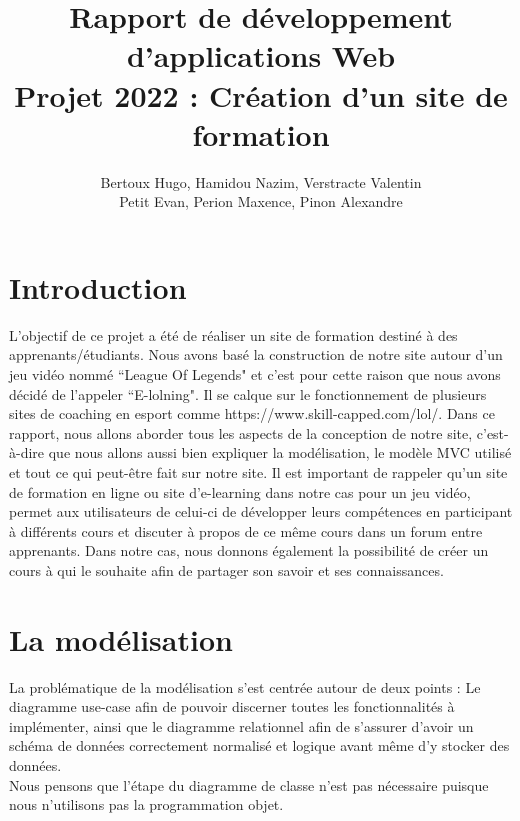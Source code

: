 \documentclass[a4paper,11pt]{article}
\title{
Rapport de développement d'applications Web\\
Projet 2022 : Création d'un site de formation
}
\author{
Bertoux Hugo, Hamidou Nazim, Verstracte Valentin\\
Petit Evan, Perion Maxence, Pinon Alexandre
}
\date{}
\begin{document}
\maketitle 
\tableofcontents

\newpage
\section{Introduction}
L'objectif de ce projet a été de réaliser un site de formation destiné à des apprenants/étudiants. Nous avons basé la construction de notre site autour d'un jeu vidéo nommé ``League Of Legends" et c'est pour cette raison que nous avons décidé de l'appeler ``E-lolning". Il se calque sur le fonctionnement de plusieurs sites de coaching en esport comme https://www.skill-capped.com/lol/.
Dans ce rapport, nous allons aborder tous les aspects de la conception de notre site, c'est-à-dire que nous allons aussi bien expliquer la modélisation, le modèle MVC utilisé et tout ce qui peut-être fait sur notre site. Il est important de rappeler qu'un site de formation en ligne ou site d'e-learning dans notre cas pour un jeu vidéo, permet aux utilisateurs de celui-ci de développer leurs compétences en participant à différents cours et discuter à propos de ce même cours dans un forum entre apprenants. Dans notre cas, nous donnons également la possibilité de créer un cours à qui le souhaite afin de partager son savoir et ses connaissances. 

\section{La modélisation}
La problématique de la modélisation s'est centrée autour de deux points : Le diagramme use-case afin de pouvoir discerner toutes les fonctionnalités à implémenter, ainsi que le diagramme relationnel afin de s'assurer d'avoir un schéma de données correctement normalisé et logique avant même d'y stocker des données.\\
Nous pensons que l'étape du diagramme de classe n'est pas nécessaire puisque nous n'utilisons pas la programmation objet.
\end{document}
